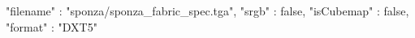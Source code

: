 { 
	"filename" : "sponza/sponza_fabric_spec.tga", 
	"srgb" : false,
	"isCubemap" : false,
	"format" : "DXT5"
}